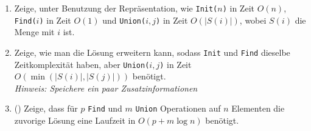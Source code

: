 \documentclass{uebung_cs}
\begin{document}
\begin{aufgabe}
\begin{center}
	\end{center}
	\begin{enumerate}
		\item Zeige, unter Benutzung der Repräsentation, wie \texttt{Init($n$)} in Zeit $O(n)$, \texttt{Find($i$)} in Zeit $O(1)$ und \texttt{Union($i,j$)} in Zeit $O(|S(i)|)$, wobei $S(i)$ die Menge mit $i$ ist.
		\item Zeige, wie man die Lösung erweitern kann, sodass \texttt{Init} und \texttt{Find} dieselbe Zeitkomplexität haben, aber \texttt{Union($i,j$)} in Zeit $O(\min(|S(i)|, |S(j)|))$ benötigt.\\
		\textit{Hinweis: Speichere ein paar Zusatzinformationen}
		\item (\hard) Zeige, dass für $p$ \texttt{Find} und $m$ \texttt{Union} Operationen auf $n$ Elementen die zuvorige Lösung eine Laufzeit in $O(p + m\log n)$ benötigt.
	\end{enumerate}
\end{aufgabe}
\end{document}
